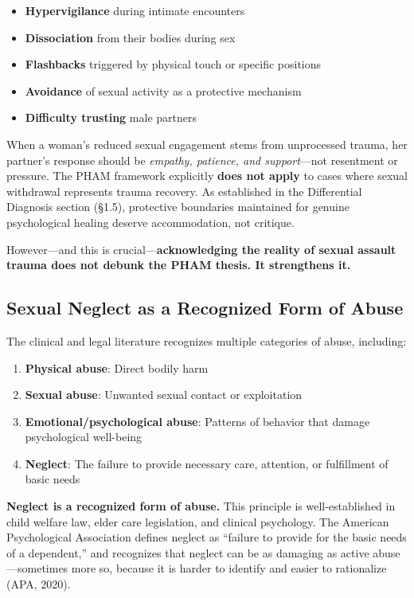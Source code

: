 \documentclass[12pt,openany]{book}
\numberwithin{equation}{chapter}
\begin{document}
\begin{itemize}
    \item \textbf{Hypervigilance} during intimate encounters
    \item \textbf{Dissociation} from their bodies during sex
    \item \textbf{Flashbacks} triggered by physical touch or specific positions
    \item \textbf{Avoidance} of sexual activity as a protective mechanism
    \item \textbf{Difficulty trusting} male partners
\end{itemize}

When a woman's reduced sexual engagement stems from unprocessed trauma, her partner's response should be \textit{empathy, patience, and support}---not resentment or pressure. The PHAM framework explicitly \textbf{does not apply} to cases where sexual withdrawal represents trauma recovery. As established in the Differential Diagnosis section (\S 1.5), protective boundaries maintained for genuine psychological healing deserve accommodation, not critique.

However---and this is crucial---\textbf{acknowledging the reality of sexual assault trauma does not debunk the PHAM thesis. It strengthens it.}

\subsection{Sexual Neglect as a Recognized Form of Abuse}

The clinical and legal literature recognizes multiple categories of abuse, including:

\begin{enumerate}
    \item \textbf{Physical abuse}: Direct bodily harm
    \item \textbf{Sexual abuse}: Unwanted sexual contact or exploitation
    \item \textbf{Emotional/psychological abuse}: Patterns of behavior that damage psychological well-being
    \item \textbf{Neglect}: The failure to provide necessary care, attention, or fulfillment of basic needs
\end{enumerate}

\textbf{Neglect is a recognized form of abuse.} This principle is well-established in child welfare law, elder care legislation, and clinical psychology. The American Psychological Association defines neglect as ``failure to provide for the basic needs of a dependent,'' and recognizes that neglect can be as damaging as active abuse---sometimes more so, because it is harder to identify and easier to rationalize (APA, 2020).
\end{document}
